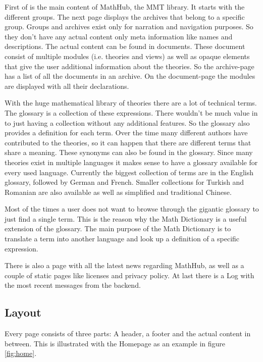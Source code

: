 \documentclass[11pt,a4paper]{article}
\begin{document}
First of is the main content of MathHub, the MMT library.
It starts with the different groups.
The next page displays the archives that belong to a specific group.
Groups and archives exist only for narration and navigation purposes.
So they don't have any actual content only meta information like names and descriptions.
The actual content can be found in documents.
These document consist of multiple modules (i.e. theories and views) as well as opaque elements that give the user additional information about the theories.
So the archive-page has a list of all the documents in an archive.
On the document-page the modules are displayed with all their declarations.

With the huge mathematical library of theories there are a lot of technical terms.
The glossary is a collection of these expressions.
There wouldn't be much value in to just having a collection without any additional features.
So the glossary also provides a definition for each term.
Over the time many different authors have contributed to the theories, so it can happen that there are different terms that share a meaning.
These synonyms can also be found in the glossary.
Since many theories exist in multiple languages it makes sense to have a glossary available for every used language.
Currently the biggest collection of terms are in the English glossary, followed by German and French.
Smaller collections for Turkish and Romanian are also available as well as simplified and traditional Chinese.\cite{smglom}

Most of the times a user does not want to browse through the gigantic glossary to just find a single term.
This is the reason why the Math Dictionary is a useful extension of the glossary.
The main purpose of the Math Dictionary is to translate a term into another language and look up a definition of a specific expression.

There is also a page with all the latest news regarding MathHub, as well as a couple of static pages like licenses and privacy policy.
At last there is a Log with the most recent messages from the backend.

\subsection{Layout}
Every page consists of three parts: A header, a footer and the actual content in between.
This is illustrated with the Homepage as an example in figure \ref{fig:home}.
\end{document}
